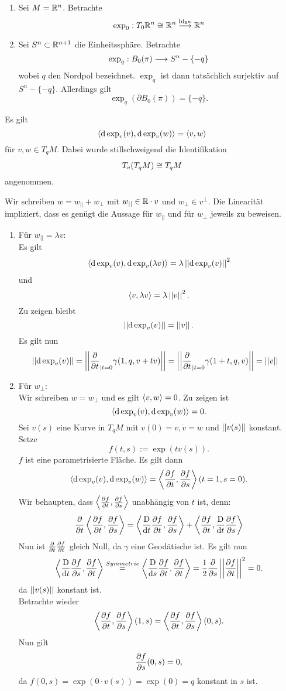 \Bsp{}
\begin{enumerate}[1)]
	\item Sei $M = \mathbb{R}^n$. Betrachte
	\[ \exp_0 : T_0\mathbb{R}^n\overset{}{\cong} \mathbb{R}^n \overset{\text{Id}_{\mathbb{R}^n}}{\longrightarrow} \mathbb{R}^n \]
	\item Sei $S^n \subset \mathbb{R}^{n+1}$ die Einheitssphäre. Betrachte
	\[ \exp_q  : B_0(\pi) \overset{}{\longrightarrow} S^n - \{-q\} \]
	wobei $q$ den Nordpol bezeichnet. $\exp_q$ ist dann tatsächlich surjektiv auf $S^n - \{-q\}$. Allerdings gilt
	\[ \exp_q(\partial B_0(\pi)) = \{-q\}. \]
\end{enumerate}

Es gilt
\[ \left<\text{d} \exp_v(v), \text{d} \exp_v(w)\right> = \left<v,w\right> \]
für $v,w \in T_qM$. Dabei wurde stillschweigend die Identifikation
\[ T_v(T_qM) \overset{}{\cong} T_qM \]
angenommen.
\begin{Beweis}{}
Wir schreiben $w = w_{||} + w_\bot$ mit $w_{||} \in \mathbb{R}\cdot {v}$ und $w_\bot \in v^\bot$. Die Linearität impliziert, dass es genügt die Aussage für $w_{||}$ und für $w_\bot$ jeweils zu beweisen.
\begin{enumerate}[1)]
	\item Für $w_{||} = \lambda v$:\\
	Es gilt
	\begin{align*}
	\left<\text{d} \exp_v(v), \text{d} \exp_v(\lambda v)\right> = {\lambda} \left|\left|\text{d} \exp_v(v)\right|\right|^2
	\end{align*} 
	und
	\[ \left<v,\lambda v\right> = \lambda \left|\left|v\right|\right|^2. \]
	Zu zeigen bleibt
	\[ \left|\left|\text{d} \exp_v(v)\right|\right| = \left|\left|v\right|\right|. \]
	Es gilt nun
	\begin{align*}
	\left|\left|\text{d} \exp_v(v)\right|\right| &= \left|\left|\frac{\partial }{\partial t}_{|t = 0} \gamma(1,q, v+tv)\right|\right| =\left|\left| \frac{\partial }{\partial t}_{|t = 0} \gamma(1+t, q, v)\right|\right| = \left|\left|v\right|\right|
	\end{align*}
	\item Für $w_\bot $:\\
	Wir schreiben $w = w_\bot$ und es gilt $\left<v,w\right> = 0$. Zu zeigen ist
	\[ \left<\text{d} \exp_v(v), \text{d} \exp_v(w)\right> = 0. \]
	Sei $v(s)$ eine Kurve in $T_qM$ mit $v(0) = v, \dot{v} = w$ und $\left|\left|v(s)\right|\right|$ konstant. Setze
	\[ f(t,s) := \exp(tv(s)). \]
	$f$ ist eine parametrisierte Fläche. Es gilt dann
	\[ \left<\text{d} \exp_v(v), \text{d} \exp_v(w)\right> = \left<\frac{\partial f}{\partial t}, \frac{\partial f}{\partial s}\right>(t = 1, s = 0). \]
	Wir behaupten, dass $\left<\frac{\partial f}{\partial t}, \frac{\partial f}{\partial s}\right>$ unabhängig von $t$ ist, denn:
	\begin{align*}
	\frac{\partial }{\partial t} \left<\frac{\partial f}{\partial t}, \frac{\partial f}{\partial s}\right> = \left<\frac{\text{D}}{\text{d} t} \frac{\partial f}{\partial t}, \frac{\partial f}{\partial s}\right> +  \left< \frac{\partial f}{\partial t}, \frac{\text{D}}{\text{d} t}\frac{\partial f}{\partial s}\right>
	\end{align*}
	Nun ist $\frac{\partial }{\partial t} \frac{\partial f}{\partial t}$ gleich Null, da $\gamma$ eine Geodätische ist. Es gilt nun
	\begin{align*}
	\left<\frac{\text{D}}{\text{d} t} \frac{\partial f}{\partial s}, \frac{\partial f}{\partial t}\right> \overset{Symmetrie}{=} \left<\frac{\text{D}}{\text{d} s}\frac{\partial f}{\partial t}, \frac{\partial f}{\partial t} \right> = \frac{1}{2} \frac{\partial }{\partial s} \left|\left|\frac{\partial f}{\partial t}\right|\right|^2 = 0,
	\end{align*}
	da $\left|\left|v(s)\right|\right|$ konstant ist.\\
	
	Betrachte wieder
	\[ \left<\frac{\partial f}{\partial t}, \frac{\partial f}{\partial s}\right>(1, s) = \left<\frac{\partial f}{\partial t}, \frac{\partial f}{\partial s}\right> (0,s). \]
	Nun gilt
	\[ \frac{\partial f}{\partial s}(0,s) = 0, \]
	da $f(0,s) = \exp(0\cdot v(s)) = \exp(0) = q$ konstant in $s$ ist.
\end{enumerate}
\end{Beweis}
